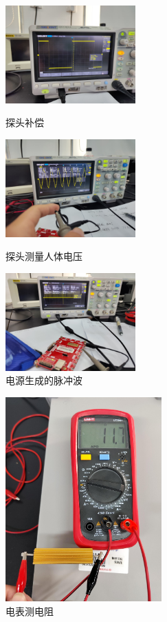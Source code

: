 \documentclass[11pt]{article}
\begin{document}
\begin{enumerate}
\begin{enumerate}
        \begin{figure}[H]
            \centering
            \begin{minipage}[t]{0.33\linewidth}
                \includegraphics[width=5cm]{Fig/4.jpg}
                \caption{探头补偿}
            \end{minipage}
            \begin{minipage}[t]{0.33\linewidth}
                \includegraphics[width=5cm]{Fig/5.jpg}
                \caption{探头测量人体电压}
            \end{minipage}
            \begin{minipage}[t]{0.33\linewidth}
                \includegraphics[width=5cm]{Fig/6.jpg}
                \caption{电源生成的脉冲波}
            \end{minipage}
            
        \end{figure}

        \begin{figure}[H]
            \centering
            \includegraphics[width=6cm]{Fig/7.jpg}
            \caption{电表测电阻}
        \end{figure}


\end{enumerate}
\end{enumerate}
\end{document}
